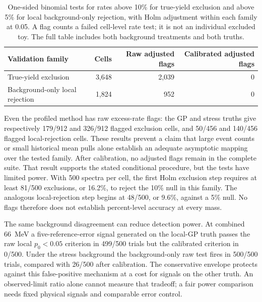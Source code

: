 \begin{table}[H]\centering\small
\begin{tabular}{lrrr}\toprule
Validation family & Cells & Raw adjusted flags & Calibrated adjusted flags\\\midrule
True-yield exclusion & 3,648 & 2,039 & 0\\
Background-only local rejection & 1,824 & 952 & 0\\\bottomrule
\end{tabular}
\caption{One-sided binomial tests for rates above 10\% for true-yield
exclusion and above 5\% for local background-only rejection, with Holm
adjustment within each family at 0.05. A flag counts a failed cell-level
rate test; it is not an individual excluded toy. The full table includes
both background treatments and both truths.}
\label{v5-tab:cal-validation}
\end{table}

Even the profiled method has raw excess-rate flags: the GP and stress
truths give respectively 179/912 and 326/912 flagged exclusion cells,
and 50/456 and 140/456 flagged local-rejection cells. These results
prevent a claim that large event counts or small historical mean pulls
alone establish an adequate asymptotic mapping over the tested family.
After calibration, no adjusted flags remain in the complete suite.
That result supports the stated conditional procedure, but the tests
have limited power. With 500 spectra per cell, the first Holm exclusion
step requires at least 81/500 exclusions, or 16.2\%, to reject the 10\%
null in this family. The analogous local-rejection step begins at
48/500, or 9.6\%, against a 5\% null. No flags therefore does not
establish percent-level accuracy at every mass.

The same background disagreement can reduce detection power. At combined
66~MeV a five-reference-error signal generated on the local-GP truth
passes the raw local $p_0<0.05$ criterion in 499/500 trials but the
calibrated criterion in 0/500. Under the stress background the
background-only raw test fires in 500/500 trials, compared with 26/500
after calibration. The conservative envelope protects against this
false-positive mechanism at a cost for signals on the other truth.
An observed-limit ratio alone cannot measure that tradeoff; a fair power
comparison needs fixed physical signals and comparable error control.

